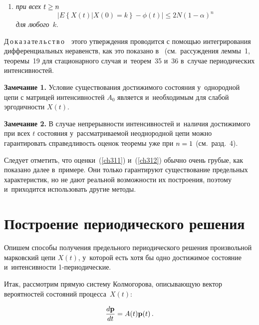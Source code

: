 \begin{multicols}{2}
\begin{enumerate}[(1)]
\item \textit{ при всех} $t \hm\ge n$
\begin{equation}
|E\left\{X(t)\left|X(0)=k\right.\right\} - \phi (t)| \le 2N
\left(1-\alpha\right)^n 
\label{ch312}
\end{equation}
\textit{для любого}~$k$.
\end{enumerate}


\noindent
Д\,о\,к\,а\,з\,а\,те\,л\,ь\,с\,т\,в\,о\ \ этого утверждения проводится с
помощью интегрирования дифференциальных неравенств, как это показано
в~\cite{zbs} (см.\ рассуждения леммы~1, теоремы~19 для стационарного
случая и~теорем~35 и~36 в~случае периодических интенсивностей.

\smallskip

\noindent
\textbf{Замечание 1.}
Условие существования достижимого состояния у~однородной цепи с
матрицей интенсивностей $A_0$ является и~необходимым для слабой
эргодичности $X(t)$.


\smallskip

\noindent
\textbf{Замечание 2.}
В случае непрерывности интенсивностей и~наличия достижимого при всех
$t$ состояния у~рассматриваемой неоднородной цепи можно
гарантировать справедливость оценок теоремы уже при $n\hm=1$ (см.\
разд.~4).


\smallskip

Следует отметить, что оценки~(\ref{ch311}) и~(\ref{ch312}) 
обычно очень грубые, как показано далее в~примере. Они
только гарантируют существование предельных характеристик, но не
дают реальной возможности их построения, поэтому и~приходится
использовать другие методы.

\vspace*{-6pt}

\section{Построение периодического решения}

\vspace*{-2pt}

Опишем способы получения предельного периодического решения
произвольной марковский цепи $X(t)$, у~которой есть хотя бы одно
достижимое состояние и~интенсивности 1-периодические.


Итак, рассмотрим прямую систему Колмогорова, описывающую вектор
вероятностей состояний процесса~$X(t)$:

\noindent
\begin{equation}
\displaystyle\frac{\displaystyle d\mathbf{p}\mathstrut}{\displaystyle dt\mathstrut}=A(t)\mathbf{p}(t)\,. 
\label{dddpdiffA}
\end{equation}


\end{multicols}

